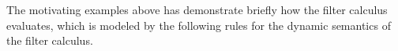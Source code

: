 
The motivating examples above has demonstrate briefly how the filter
calculus evaluates, which is modeled by the following rules for the
dynamic semantics of the filter calculus.

